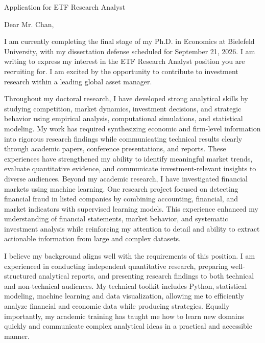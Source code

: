 \documentclass[11pt]{article}
\begin{document}
\vspace{0.1cm}

\noindent
Application for ETF Research Analyst \\

\vspace{0.05cm}

\noindent Dear Mr. Chan,

I am currently completing the final stage of my Ph.D. in Economics at Bielefeld University, with my dissertation defense scheduled for September 21, 2026. I am writing to express my interest in the ETF Research Analyst position you are recruiting for. I am excited by the opportunity to contribute to investment research within a leading global asset manager.

Throughout my doctoral research, I have developed strong analytical skills by studying competition, market dynamics, investment decisions, and strategic behavior using empirical analysis, computational simulations, and statistical modeling. My work has required synthesizing economic and firm-level information into rigorous research findings while communicating technical results clearly through academic papers, conference presentations, and reports. These experiences have strengthened my ability to identify meaningful market trends, evaluate quantitative evidence, and communicate investment-relevant insights to diverse audiences.
Beyond my academic research, I have investigated financial markets using machine learning. One research project focused on detecting financial fraud in listed companies by combining accounting, financial, and market indicators with supervised learning models. This experience enhanced my understanding of financial statements, market behavior, and systematic investment analysis while reinforcing my attention to detail and ability to extract actionable information from large and complex datasets.

I believe my background aligns well with the requirements of this position. I am experienced in conducting independent quantitative research, preparing well-structured analytical reports, and presenting research findings to both technical and non-technical audiences. My technical toolkit includes Python, statistical modeling, machine learning and data visualization, allowing me to efficiently analyze financial and economic data while producing strategies. Equally importantly, my academic training has taught me how to learn new domains quickly and communicate complex analytical ideas in a practical and accessible manner.
\end{document}
